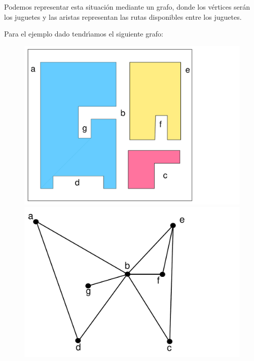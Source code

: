 \documentclass[twoside]{report}
\begin{document}
\vspace{0.5cm}
Podemos representar esta situaci\'{o}n mediante un grafo, donde los v\'{e}rtices ser\'{a}n los juguetes y las aristas representan las rutas disponibles entre los juguetes.
\vspace{0.2cm}

Para el ejemplo dado tendr\'{\i}amos el siguiente grafo:

      \begin{center}
           \begin{figure}[h!]\centering
           \includegraphics[scale=0.15]{pdfs/B1.pdf}
           \includegraphics[scale=0.2]{pdfs/B2.pdf}
           \end{figure}
      \end{center}
\end{document}
